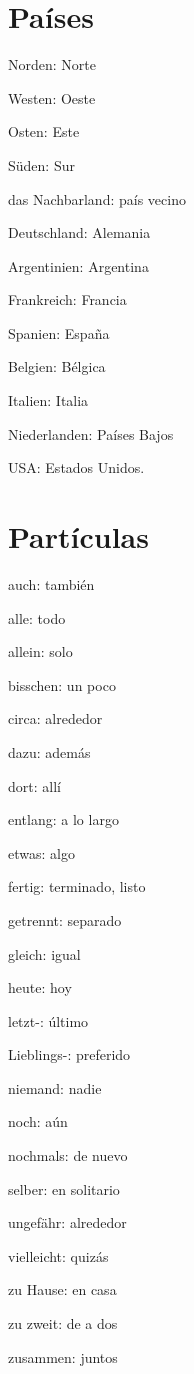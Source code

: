 \section{Países}
\begin{multicols}{3}
\begin{myitemize}
\item Norden: Norte
\item Westen: Oeste
\item Osten: Este
\item Süden: Sur
\item das Nachbarland: país vecino
\item Deutschland: Alemania
\item Argentinien: Argentina
\item Frankreich: Francia
\item Spanien: España
\item Belgien: Bélgica
\item Italien: Italia
\item Niederlanden: Países Bajos
\item USA: Estados Unidos.
\end{myitemize}
\end{multicols}


\section{Partículas}
\begin{multicols}{3}
\begin{myitemize}
\item auch: también
\item alle: todo
\item allein: solo
\item bisschen: un poco
\item circa: alrededor
\item dazu: además
\item dort: allí
\item entlang: a lo largo
\item etwas: algo
\item fertig: terminado, listo
\item getrennt: separado
\item gleich: igual
\item heute: hoy
\item letzt-: último
\item Lieblings-: preferido
\item niemand: nadie
\item noch: aún
\item nochmals: de nuevo
\item selber: en solitario
\item ungefähr: alrededor
\item vielleicht: quizás
\item zu Hause: en casa
\item zu zweit: de a dos
\item zusammen: juntos
\end{myitemize}
\end{multicols}


